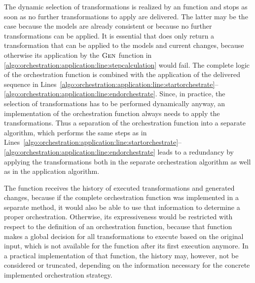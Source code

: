 The dynamic selection of transformations is realized by an  function and stops as soon as no further transformations to apply are delivered.
The latter may be the case because the models are already consistent or because no further transformations can be applied.
It is essential that  does only return a transformation that can be applied to the models and current changes, because otherwise its application by the $\textsc{Gen}_{}$ function in \autoref{algo:orchestration:application:line:stepcalculation} would fail.
The complete logic of the orchestration function is combined with the application of the delivered sequence in Lines~\ref{algo:orchestration:application:line:startorchestrate}--\ref{algo:orchestration:application:line:endorchestrate}.
Since, in practice, the selection of transformations has to be performed dynamically anyway, an implementation of the orchestration function always needs to apply the transformations.
Thus a separation of the orchestration function into a separate algorithm, which performs the same steps as in Lines~\ref{algo:orchestration:application:line:startorchestrate}--\ref{algo:orchestration:application:line:endorchestrate} leads to a redundancy by applying the transformations both in the separate orchestration algorithm as well as in the application algorithm.

The  function receives the history of executed transformations and generated changes, because if the complete orchestration function was implemented in a separate method, it would also be able to use that information to determine a proper orchestration.
Otherwise, its expressiveness would be restricted with respect to the definition of an orchestration function, because that function makes a global decision for all transformations to execute based on the original input, which is not available for the  function after its first execution anymore.
In a practical implementation of that function, the history may, however, not be considered or truncated, depending on the information necessary for the concrete implemented orchestration strategy.

